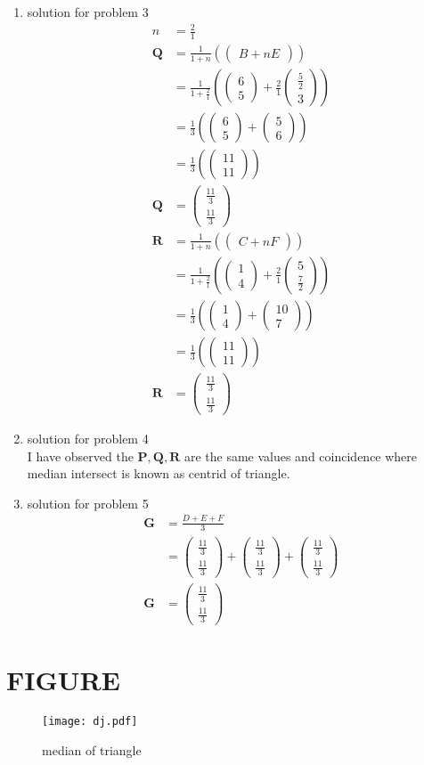 \documentclass[12pt]{article}
\providecommand{\brak}[1]{\ensuremath{\left(#1\right)}}
\newcommand{\myvec}[1]{\ensuremath{\begin{pmatrix}#1\end{pmatrix}}}
\let\vec\mathbf
\begin{document}
\begin{enumerate}
\item solution for problem 3
\begin{align}
n&=\frac{2}{1}\\
\vec{Q}&=\frac{1}{1+n}\brak{\myvec{B+nE}}\\
&=\frac{1}{1+\frac{2}{1}}\brak{\myvec{6\\5}+\frac{2}{1}\myvec{\frac{5}{2}\\ 3}}\\
&=\frac{1}{3}\brak{\myvec{6\\5}+\myvec{5\\6}}\\
&=\frac{1}{3}\brak{\myvec{11\\11}}\\
\vec{Q}&=\myvec{\frac{11}{3}\\[2pt] \frac{11}{3}}\\
\vec{R}&=\frac{1}{1+n}\brak{\myvec{C+nF}}\\
&=\frac{1}{1+\frac{2}{1}}\brak{\myvec{1\\4}+\frac{2}{1}\myvec{5\\ \frac{7}{2}}}\\
&=\frac{1}{3}\brak{\myvec{1\\4}+\myvec{10\\7}}\\
&=\frac{1}{3}\brak{\myvec{11\\11}}\\
\vec{R}&=\myvec{\frac{11}{3}\\[2pt] \frac{11}{3}}
\end{align}

\item solution for problem 4
   \\I have observed the $\vec{P},\vec{Q},\vec{R}$ are the same values and coincidence where median intersect is known as centrid of triangle.
   
\item solution for problem 5
\begin{align}
\vec{G}&=\frac{D+E+F}{3}\\
&=\myvec{\frac{11}{3}\\[2pt] \frac{11}{3}}+\myvec{\frac{11}{3}\\[2pt] \frac{11}{3}}+\myvec{\frac{11}{3}\\[2pt] \frac{11}{3}}\\
\vec{G}&=\myvec{\frac{11}{3}\\[2pt] \frac{11}{3}}
\end{align} 
\end{enumerate}
\section{FIGURE}
\begin{figure}[h!]
\centering
\texttt{[image: dj.pdf]}
\caption{median of triangle}
		\label{fig:Figure}
\end{figure}
\end{document}
